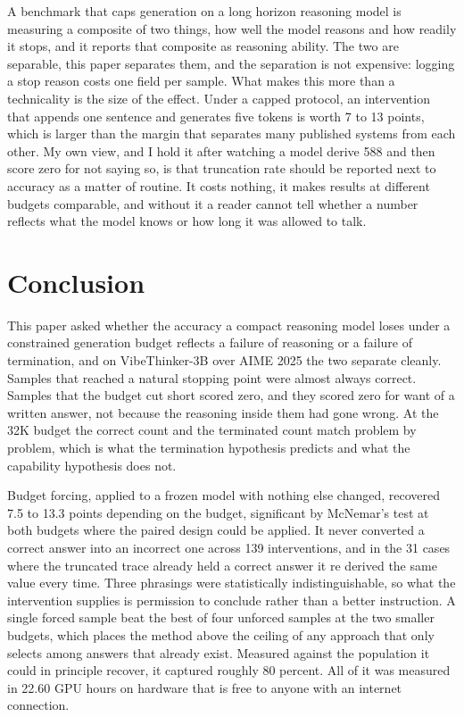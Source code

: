 \documentclass[conference]{IEEEtran}
\begin{document}
A benchmark that caps generation on a long horizon reasoning model is measuring a
composite of two things, how well the model reasons and how readily it stops, and
it reports that composite as reasoning ability. The two are separable, this paper
separates them, and the separation is not expensive: logging a stop reason costs
one field per sample. What makes this more than a technicality is the size of the
effect. Under a capped protocol, an intervention that appends one sentence and
generates five tokens is worth 7 to 13 points, which is larger than the margin
that separates many published systems from each other. My own view, and I hold it
after watching a model derive 588 and then score zero for not saying so, is that
truncation rate should be reported next to accuracy as a matter of routine. It
costs nothing, it makes results at different budgets comparable, and without it a
reader cannot tell whether a number reflects what the model knows or how long it
was allowed to talk.

\section{Conclusion}

This paper asked whether the accuracy a compact reasoning model loses under a
constrained generation budget reflects a failure of reasoning or a failure of
termination, and on VibeThinker-3B over AIME 2025 the two separate cleanly.
Samples that reached a natural stopping point were almost always correct. Samples
that the budget cut short scored zero, and they scored zero for want of a written
answer, not because the reasoning inside them had gone wrong. At the 32K
budget the correct count and the terminated count match problem by problem, which
is what the termination hypothesis predicts and what the capability hypothesis
does not.

Budget forcing, applied to a frozen model with nothing else changed, recovered 7.5
to 13.3 points depending on the budget, significant by McNemar's test at both
budgets where the paired design could be applied. It never converted a correct
answer into an incorrect one across 139 interventions, and in the 31 cases where
the truncated trace already held a correct answer it re derived the same value
every time. Three phrasings were statistically indistinguishable, so what the
intervention supplies is permission to conclude rather than a better instruction.
A single forced sample beat the best of four unforced samples at the two smaller
budgets, which places the method above the ceiling of any approach that only
selects among answers that already exist. Measured against the population it could
in principle recover, it captured roughly 80 percent. All of it was measured in
22.60 GPU hours on hardware that is free to anyone with an internet connection.
\end{document}
